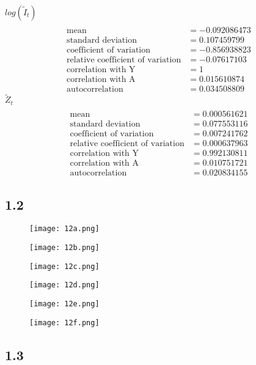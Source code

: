 \documentclass[letterpaper,12pt]{article}
\theoremstyle{definition}
\begin{document}
$log(\tilde{I}_t)$
\begin{align*}
\\\text{mean} &= -0.092086473
\\\text{standard deviation} &= 0.107459799
\\\text{coefficient of variation}&=-0.856938823
\\\text{relative coefficient of variation}&=-0.07617103
\\\text{correlation with Y}&=1
\\\text{correlation with A}&=0.015610874
\\\text{autocorrelation}&=0.034508809
\end{align*}
$\tilde{Z}_t$
\begin{align*}
\\\text{mean} &= 0.000561621
\\\text{standard deviation} &= 0.077553116
\\\text{coefficient of variation}&=0.007241762
\\\text{relative coefficient of variation}&=0.000637963
\\\text{correlation with Y}&=0.992130811
\\\text{correlation with A}&=0.010751721
\\\text{autocorrelation}&=0.020834155
\end{align*}

\subsection*{1.2}


\begin{figure}[H]
\texttt{[image: 12a.png]}
\end{figure}
\begin{figure}[H]
\texttt{[image: 12b.png]}
\end{figure}
\begin{figure}[H]
\texttt{[image: 12c.png]}
\end{figure}
\begin{figure}[H]
\texttt{[image: 12d.png]}
\end{figure}
\begin{figure}[H]
\texttt{[image: 12e.png]}
\end{figure}
\begin{figure}[H]
\texttt{[image: 12f.png]}
\end{figure}

\subsection*{1.3}
\end{document}
